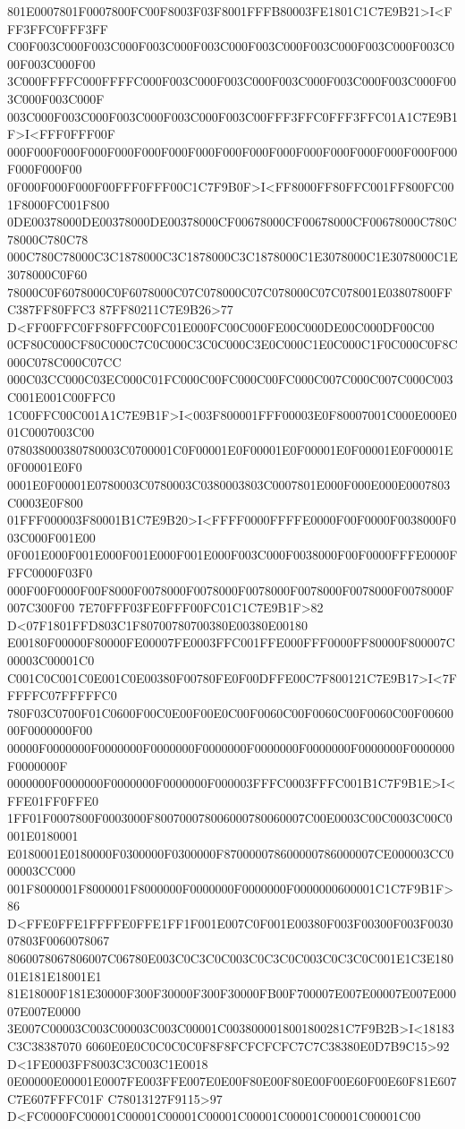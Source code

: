 801E0007801F0007800FC00F8003F03F8001FFFB80003FE1801C1C7E9B21>I<FFF3FFC0FFF3FF
C00F003C000F003C000F003C000F003C000F003C000F003C000F003C000F003C000F003C000F00
3C000FFFFC000FFFFC000F003C000F003C000F003C000F003C000F003C000F003C000F003C000F
003C000F003C000F003C000F003C000F003C00FFF3FFC0FFF3FFC01A1C7E9B1F>I<FFF0FFF00F
000F000F000F000F000F000F000F000F000F000F000F000F000F000F000F000F000F000F000F00
0F000F000F000F00FFF0FFF00C1C7F9B0F>I<FF8000FF80FFC001FF800FC001F8000FC001F800
0DE00378000DE00378000DE00378000CF00678000CF00678000CF00678000C780C78000C780C78
000C780C78000C3C1878000C3C1878000C3C1878000C1E3078000C1E3078000C1E3078000C0F60
78000C0F6078000C0F6078000C07C078000C07C078000C07C078001E03807800FFC387FF80FFC3
87FF80211C7E9B26>77 D<FF00FFC0FF80FFC00FC01E000FC00C000FE00C000DE00C000DF00C00
0CF80C000CF80C000C7C0C000C3C0C000C3E0C000C1E0C000C1F0C000C0F8C000C078C000C07CC
000C03CC000C03EC000C01FC000C00FC000C00FC000C007C000C007C000C003C001E001C00FFC0
1C00FFC00C001A1C7E9B1F>I<003F800001FFF00003E0F80007001C000E000E001C0007003C00
078038000380780003C0700001C0F00001E0F00001E0F00001E0F00001E0F00001E0F00001E0F0
0001E0F00001E0780003C0780003C0380003803C0007801E000F000E000E0007803C0003E0F800
01FFF000003F80001B1C7E9B20>I<FFFF0000FFFFE0000F00F0000F0038000F003C000F001E00
0F001E000F001E000F001E000F001E000F003C000F0038000F00F0000FFFE0000FFFC0000F03F0
000F00F0000F00F8000F0078000F0078000F0078000F0078000F0078000F0078000F007C300F00
7E70FFF03FE0FFF00FC01C1C7E9B1F>82 D<07F1801FFD803C1F80700780700380E00380E00180
E00180F00000F80000FE00007FE0003FFC001FFE000FFF0000FF80000F800007C00003C00001C0
C001C0C001C0E001C0E00380F00780FE0F00DFFE00C7F800121C7E9B17>I<7FFFFFC07FFFFFC0
780F03C0700F01C0600F00C0E00F00E0C00F0060C00F0060C00F0060C00F0060000F0000000F00
00000F0000000F0000000F0000000F0000000F0000000F0000000F0000000F0000000F0000000F
0000000F0000000F0000000F0000000F000003FFFC0003FFFC001B1C7F9B1E>I<FFE01FF0FFE0
1FF01F0007800F0003000F800700078006000780060007C00E0003C00C0003C00C0001E0180001
E0180001E0180000F0300000F0300000F870000078600000786000007CE000003CC000003CC000
001F8000001F8000001F8000000F0000000F0000000F0000000600001C1C7F9B1F>86
D<FFE0FFE1FFFFE0FFE1FF1F001E007C0F001E00380F003F00300F003F003007803F0060078067
8060078067806007C06780E003C0C3C0C003C0C3C0C003C0C3C0C001E1C3E18001E181E18001E1
81E18000F181E30000F300F30000F300F30000FB00F700007E007E00007E007E00007E007E0000
3E007C00003C003C00003C003C00001C0038000018001800281C7F9B2B>I<18183C3C38387070
6060E0E0C0C0C0C0F8F8FCFCFCFC7C7C38380E0D7B9C15>92 D<1FE0003FF8003C3C003C1E0018
0E00000E00001E0007FE003FFE007E0E00F80E00F80E00F00E60F00E60F81E607C7E607FFFC01F
C78013127F9115>97 D<FC0000FC00001C00001C00001C00001C00001C00001C00001C00001C00
